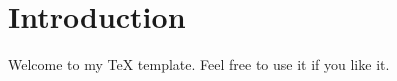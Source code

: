 \documentclass{article}
\begin{document}


\section{Introduction}

Welcome to my TeX template.  Feel free to use it if you like it.




\end{document}
